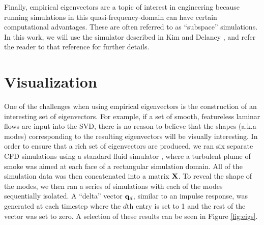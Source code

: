 Finally, empirical eigenvectors are a topic of interest in engineering because running simulations in this quasi-frequency-domain can have certain computational advantages. These are often referred to as ``subspace'' simulations. In this work, we will use the simulator described in Kim and Delaney \cite{Kim2013}, and refer the reader to that reference for further details.


\section*{Visualization}

One of the challenges when using empirical eigenvectors is the construction of an interesting set of eigenvectors. For example, if a set of smooth, featureless laminar flows are input into the SVD, there is no reason to believe that the shapes (a.k.a modes) corresponding to the resulting eigenvectors will be visually interesting. In order to ensure that a rich set of eigenvectors are produced, we ran six separate CFD simulations using a standard fluid simulator \cite{Stam99}, where a turbulent plume of smoke was aimed at each face of a rectangular simulation domain. All of the simulation data was then concatenated into a matrix $\mathbf{X}$. To reveal the shape of the modes, we then ran a series of simulations with each of the modes sequentially isolated. A ``delta'' vector $\mathbf{q}_d$, similar to an impulse response, was generated at each timestep where the $d$th entry is set to 1 and the rest of the vector was set to zero. A selection of these results can be seen in Figure \ref{fig:eigs}.


